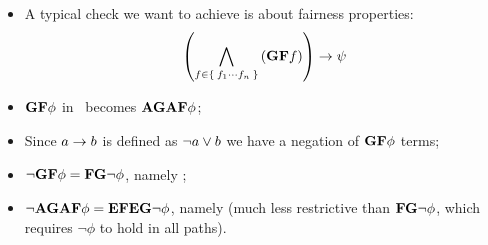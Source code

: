 \documentclass[a3paper]{article}
\begin{document}
            \begin{itemize}

            \item   A typical check we want to achieve is about fairness
                    properties:
                    \[
                    \left(
                        \bigwedge_{f \in \Set{ f_1 \cdots f_n }}^{}\left({\mathcal{\sf \bf G}\mathcal{\sf \bf F}f}\right)
                    \right)
                    \rightarrow \psi
                    \]

            \item   $\mathcal{\sf \bf G}\mathcal{\sf \bf F}\phi$ in \CTL\ becomes $\mathcal{\mathcal{\sf \bf A}}\mathcal{\sf \bf G}\mathcal{\mathcal{\sf \bf A}}\mathcal{\sf \bf F}\phi$;

            \item   Since $a \rightarrow b$ is defined as $\neg a \vee b$ we
                    have a negation of $\mathcal{\sf \bf G}\mathcal{\sf \bf F}\phi$ terms;

            \item   $\neg \mathcal{\sf \bf G}\mathcal{\sf \bf F}\phi = \mathcal{\sf \bf F}\mathcal{\sf \bf G}\neg \phi$, namely
                    ;

            \item   $\neg \mathcal{\mathcal{\sf \bf A}}\mathcal{\sf \bf G}\mathcal{\mathcal{\sf \bf A}}\mathcal{\sf \bf F}\phi = \mathcal{\mathcal{\sf \bf E}}\mathcal{\sf \bf F}\mathcal{\mathcal{\sf \bf E}}\mathcal{\sf \bf G}\neg \phi$, namely
                     (much less restrictive than $\mathcal{\sf \bf F}\mathcal{\sf \bf G}\neg
                    \phi$, which requires $\neg \phi$ to hold in all
                    paths).

            \end{itemize}
\end{document}
